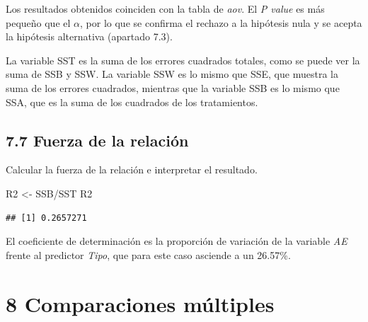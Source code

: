 \documentclass[
]{article}
\newenvironment{Shaded}{\begin{snugshade}}{\end{snugshade}}
\newcommand{\NormalTok}[1]{#1}
\newcommand{\OtherTok}[1]{\textcolor[rgb]{0.56,0.35,0.01}{#1}}
\newcommand{\SpecialCharTok}[1]{\textcolor[rgb]{0.00,0.00,0.00}{#1}}
\begin{document}
\vspace{0.3cm}

Los resultados obtenidos coinciden con la tabla de \emph{aov}. El
\emph{P value} es más pequeño que el \(\alpha\), por lo que se confirma
el rechazo a la hipótesis nula y se acepta la hipótesis alternativa
(apartado 7.3).

\vspace{0.3cm}

La variable SST es la suma de los errores cuadrados totales, como se
puede ver la suma de SSB y SSW. La variable SSW es lo mismo que SSE, que
muestra la suma de los errores cuadrados, mientras que la variable SSB
es lo mismo que SSA, que es la suma de los cuadrados de los
tratamientos.

\vspace{0.3cm}

\hypertarget{fuerza-de-la-relaciuxf3n}{%
\subsection{7.7 Fuerza de la relación}\label{fuerza-de-la-relaciuxf3n}}

Calcular la fuerza de la relación e interpretar el resultado.

\vspace{0.3cm}

\begin{Shaded}
\begin{Highlighting}[]
\NormalTok{R2 }\OtherTok{\textless{}{-}}\NormalTok{ SSB}\SpecialCharTok{/}\NormalTok{SST}
\NormalTok{R2}
\end{Highlighting}
\end{Shaded}

\begin{verbatim}
## [1] 0.2657271
\end{verbatim}

\vspace{0.3cm}

El coeficiente de determinación es la proporción de variación de la
variable \emph{AE} frente al predictor \emph{Tipo}, que para este caso
asciende a un 26.57\%.

\newpage

\hypertarget{comparaciones-muxfaltiples}{%
\section{8 Comparaciones múltiples}\label{comparaciones-muxfaltiples}}
\end{document}
